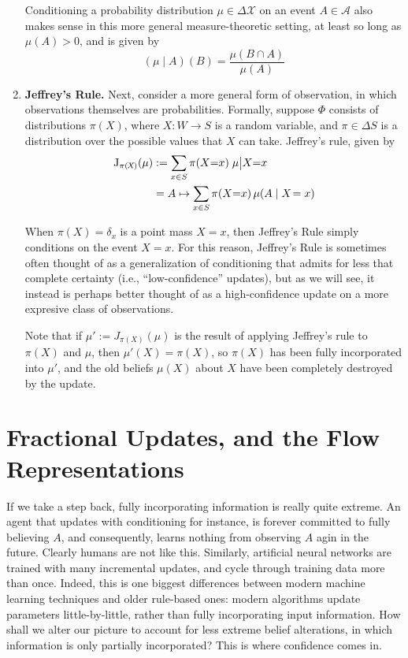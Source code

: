 \documentclass{uai2023}
\theoremstyle{plain}
\theoremstyle{definition}
\newcommand\X{\mathcal X}
\begin{document}
\begin{enumerate}
{	

	Conditioning a probability distribution $\mu \in \Delta\X$ on an event $A \in \mathcal A$ also makes sense in this more general measure-theoretic setting, at least so long as $\mu(A) > 0$, and is given by
$$
(\mu \mid A) (B) = \frac{\mu(B \cap A)}{\mu(A)}
	$$
	}


	\item \textbf{Jeffrey's Rule.}
Next, consider a more general form of observation, in which observations themselves are probabilities.
Formally, suppose $\Phi$ consists of distributions $\pi(X)$,
where $X : W \to S$ is a random variable,
and $\pi \in \Delta S$ is a distribution over the possible values that $X$ can take.
	Jeffrey's rule, given by
	\begin{align*}
\mathrm{J}_{\pi(\mskip-2muX\mskip-2mu)}
		(\mu) &:= \sum_{x \in S} \pi(X{=}x) \;  \mu \big|
            X{=}x
\\
			&= A \mapsto \sum_{x \in S} \pi(X{=}x)\, \mu( A \mid X \!= x)
	\end{align*}

	When $\pi(X) = \delta_x$ is a point mass $X=x$, then Jeffrey's Rule simply conditions on the event $X = x$.
For this reason, Jeffrey's Rule is sometimes often thought of as a generalization of conditioning that admits for less that complete certainty (i.e., ``low-confidence'' updates), but as we will see, it instead is perhaps better thought of as a high-confidence update on a more expresive class of observations.

	Note that if $\mu' := J_{\pi(X)}(\mu)$ is the result of applying Jeffrey's rule to $\pi(X)$ and $\mu$,
then $\mu'(X) = \pi(X)$, so $\pi(X)$ has been fully incorporated into $\mu'$, and the old beliefs $\mu(X)$ about $X$ have been completely destroyed by the update.
\end{enumerate}
 
\section{Fractional Updates, and the
    Flow Representations}


If we take a step back, fully incorporating information is really quite extreme.
An agent that updates with conditioning for instance, is forever committed to fully believing $A$, and consequently, learns nothing from observing $A$ agin in the future.
Clearly humans are not like this.
Similarly, artificial neural networks are trained with many incremental updates, and cycle through training data more than once.
Indeed, this is one biggest differences between modern machine learning techniques and  older rule-based ones: modern algorithms update parameters little-by-little, rather than fully incorporating input information.
How shall we alter our picture to account for less extreme belief alterations, in which information is only partially incorporated?
This is where confidence comes in.
\end{document}
